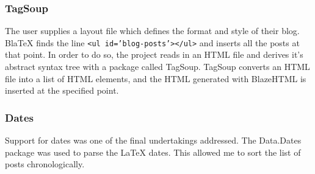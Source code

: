   \subsubsection{TagSoup}

    The user supplies a layout file which defines the format and style of their blog. BlaTeX finds the line \texttt{<ul id='blog-posts'></ul>} and inserts all the posts at that point. In order to do so, the project reads in an HTML file and derives it's abstract syntax tree with a package called TagSoup. TagSoup converts an HTML file into a list of HTML elements, and the HTML generated with BlazeHTML is inserted at the specified point. 

  \subsubsection{Dates}

    Support for dates was one of the final undertakings addressed. The Data.Dates package was used to parse the LaTeX dates. This allowed me to sort the list of posts chronologically.  